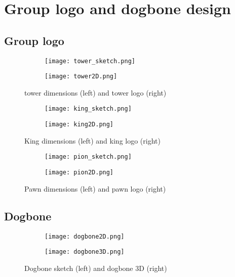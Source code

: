 \section{Group logo and dogbone design}

\subsection{Group logo}

\begin{figure}[H]
    \centering
    \begin{subfigure}[b]{0.4\textwidth}
        \texttt{[image: tower\_sketch.png]}
    \end{subfigure}
    \begin{subfigure}[b]{0.4\textwidth}
        \texttt{[image: tower2D.png]}
    \end{subfigure}
    \caption{tower dimensions (left) and tower logo (right)}
    \label{fig:tower}
\end{figure}

\begin{figure}[H]
    \centering
    \begin{subfigure}[b]{0.4\textwidth}
        \texttt{[image: king\_sketch.png]}
    \end{subfigure}
    \begin{subfigure}[b]{0.45\textwidth}
        \texttt{[image: king2D.png]}
    \end{subfigure}
    \caption{King dimensions (left) and king logo (right)}
    \label{fig:king}
\end{figure}

\begin{figure}[H]
    \centering
    \begin{subfigure}[b]{0.4\textwidth}
        \texttt{[image: pion\_sketch.png]}
    \end{subfigure}
    \begin{subfigure}[b]{0.45\textwidth}
        \texttt{[image: pion2D.png]}
    \end{subfigure}
    \caption{Pawn dimensions (left) and pawn logo (right)}
    \label{fig:pawn}
\end{figure}

\subsection{Dogbone}

\begin{figure}[H]
    \centering
    \begin{subfigure}[b]{0.45\textwidth}
        \texttt{[image: dogbone2D.png]}
    \end{subfigure}
    \begin{subfigure}[b]{0.4\textwidth}
        \texttt{[image: dogbone3D.png]}
    \end{subfigure}
    \caption{Dogbone sketch (left) and dogbone 3D (right)}
    \label{fig:dogbone}
\end{figure}